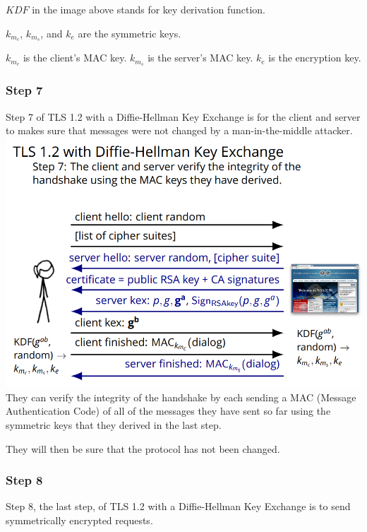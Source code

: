 \documentclass[11pt]{article} %
\begin{document}
{$KDF$ in the image above stands for key derivation function.

$k_{m_c}$, $k_{m_s}$, and $k_{e}$ are the symmetric keys.

$k_{m_c}$ is the client's MAC key. $k_{m_s}$ is the server's MAC key. $k_{e}$ 
is the encryption key.

\newpage
\subsubsection{Step 7}
Step 7 of TLS 1.2 with a Diffie-Hellman Key Exchange is for the client and 
server to makes sure that messages were not changed by a man-in-the-middle 
attacker. \\

\includegraphics[scale=1.2]{./DiffieStep7.png}
\\

They can verify the integrity of the handshake by each sending a MAC (Message 
Authentication Code) of all of the messages they have sent so far using the 
symmetric keys that they derived in the last step.

They will then be sure that the protocol has not been changed.

\newpage
\subsubsection{Step 8}
Step 8, the last step, of TLS 1.2 with a Diffie-Hellman Key Exchange is to 
send symmetrically encrypted requests. \\

}
\end{document}
